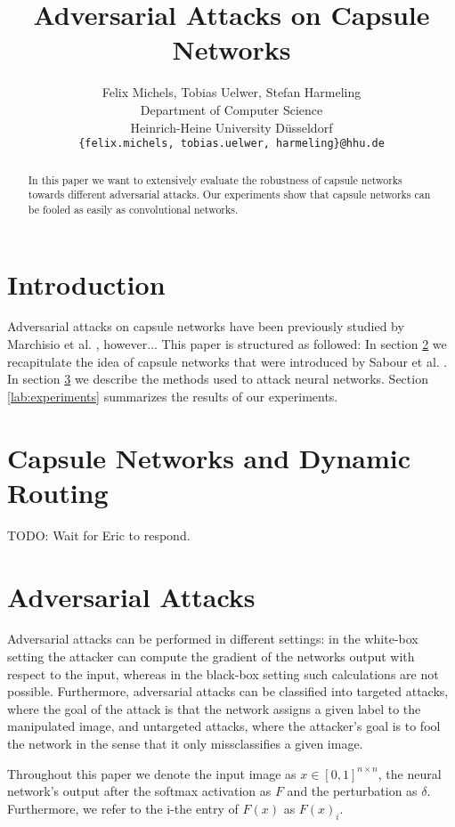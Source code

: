 \documentclass{article}
\title{Adversarial Attacks on Capsule Networks}
\author{%
  Felix Michels, Tobias Uelwer, Stefan Harmeling \\
  Department of Computer Science\\
  Heinrich-Heine University Düsseldorf\\
  \texttt{\{felix.michels, tobias.uelwer, harmeling\}@hhu.de} \\
}
\begin{document}
\maketitle

\begin{abstract}
	In this paper we want to extensively evaluate the robustness of capsule networks towards different adversarial attacks. Our experiments show that capsule networks can be fooled as easily as convolutional networks.

\end{abstract}

\section{Introduction}

Adversarial attacks on capsule networks have been previously studied by Marchisio et al. \cite{marchisio}, however... This paper is structured as followed: In section \ref{lab:capsules} we recapitulate the idea of capsule networks that were introduced by Sabour et al. \cite{capsules}. In section \ref{lab:attacks} we describe the methods used to attack neural networks. Section \ref{lab:experiments} summarizes the results of our experiments.

\section{Capsule Networks and Dynamic Routing}
\label{lab:capsules}

TODO: Wait for Eric to respond.
\cite{capsules}

\section{Adversarial Attacks}
\label{lab:attacks}

Adversarial attacks can be performed in different settings: in the white-box setting the attacker can compute the gradient of the networks output with respect to the input, whereas in the black-box setting such calculations are not possible. Furthermore, adversarial attacks can be classified into targeted attacks, where the goal of the attack is that the network assigns a given label to the manipulated image, and untargeted attacks, where the attacker's goal is to fool the network in the sense that it only missclassifies a given image.

Throughout this paper we denote the input image as $x\in [0,1]^{n\times n}$, the neural network's output after the softmax activation as $F$ and the perturbation as $\delta$. Furthermore, we refer to the i-the entry of $F(x)$ as $F(x)_i$.
\end{document}
